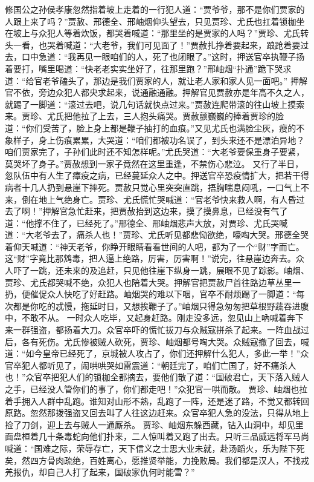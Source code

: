 \documentclass[12pt,oneside]{book}
\begin{document}
修国公之孙侯孝康忽然指着坡上走着的一行犯人道：“贾爷爷，那不是你们贾家的人跟上来了吗？”贾赦、邢德全、邢岫烟仰头望去，只见贾珍、尤氏也扛着锁枷坐在坡上与众犯人等着炊饭，都哭着喊道：“那里坐的是贾家的人吗？”贾珍、尤氏转头一看，也哭着喊道：“大老爷，我们可见面了！”贾赦扎挣着要起来，踉跄着要过去，口中急道：“我再见一眼咱们的人，死了也闭眼了。”这时，押送官卒执鞭子扬着要打，嘴里喝道：“快老老实实坐好了，往那里跑？”邢岫烟“扑通”跪下哭求道：“给官老爷磕头了，那边是我们贾家的人，就让老人家和家人见一面吧。”
押解官不依，旁边众犯人都央求起来，说通融通融。押解官见贾赦亦是年高不久之人，就踢了一脚道：“滚过去吧，说几句话就快点过来。”贾赦连爬带滚的往山坡上摸索来。贾珍、尤氏把他拉了上去，三人抱头痛哭。贾赦颤巍巍的捧着贾珍的脸道：“你们受苦了，脸上身上都是鞭子抽打的血痕。”又见尤氏也满脸尘灰，瘦的不象样子，身上伤痕累累，大哭道：“咱们都被功名误了，到头来还不是漂泊异地？咱们贾家完了，子孙们此时还不知怎样呢。”尤氏哭道：“大老爷要保重身子要紧，莫哭坏了身子。”贾赦想到一家子竟然在这里重逢，不禁伤心悲泣。
又行了半日，忽队伍中有人生了瘴疫之病，已经蔓延众人之中。押送官卒恐疫情扩大，把若干得病者十几人扔到悬崖下摔死。贾赦只觉心里突突直跳，捂胸喘息闷吼，一口气上不来，倒在地上气绝身亡。贾珍、尤氏慌忙哭喊道：“官老爷快来救人啊，有人昏过去了啊！”押解官急忙赶来，把贾赦抬到这边来，摸了摸鼻息，已经没有气了道：“他撑不住了，已经死了。”邢德全、邢岫烟悲声大放，对贾珍、尤氏哭喊道：“大老爷去了，痛杀人也！”贾珍、尤氏听见都悲恸欲绝，嚎啕大哭。邢德全哭着仰天喊道：“神天老爷，你睁开眼睛看看世间的人吧，都为了一个“财”字而亡。这“财”字竟比那鸩毒，把人逼上绝路，厉害，厉害啊！”说完，往悬崖边奔去。众人吓了一跳，还未来的及追赶，只见他往崖下纵身一跳，展眼不见了踪影。岫烟、贾珍、尤氏都哭喊不绝，众犯人也陪着大哭。押解官把贾赦尸首往路边草丛里一扔，便催促众人快吃了好赶路。岫烟哭的难以下咽，官卒不耐烦踢了一脚道：“每次都是你吃的忒慢，拖延时日，又想挨鞭子了。”岫烟只得急匆匆把草根野蔬吞进腹中，不敢不从。
一时众人吃毕，又起身赶路。刚走没多远，忽见山上吶喊着奔下来一群强盗，都扬着大刀。众官卒吓的慌忙拔刀与众贼寇拼杀了起来。一阵血战过后，各有死伤。尤氏惨被贼人砍死，贾珍、岫烟都号啕大哭。众贼寇撤了回去，喊道：“如今皇帝已经死了，京城被人攻占了，你们还押解什么犯人，多此一举！”众官卒犯人都听见了，闹哄哄哭如雷震道：“朝廷完了，咱们亡国了，好不痛杀人也！”众官卒把犯人们的锁枷全都摘去，要他们散了道：“国破君亡，天下落入贼人之手，已经没人管你们的事了，你们都走吧！”众犯官一哄而散。
贾珍、岫烟也拉着手拥入人群中乱跑。谁知对山形不熟，乱跑了一阵，还是迷了路，不觉又都转回原路。忽然那拨强盗又回去叫了人往这边赶来。众官卒犯人急的没法，只得从地上捡了刀剑，迎上去与贼人一通厮杀。
贾珍、岫烟东躲西藏，钻入山洞中，却见里面盘桓着几十条毒蛇向他们扑来，二人惊叫着又跑了出去。只听三品威远将军马尚喊道：“国难之际，荣辱存亡，天下信义之士思大业未就，赴汤蹈火，乐为陛下死矣，然四方骨肉疏绝，百姓离心，愿推贤举能，力挽败局。我们都是汉人，不找戎羌报仇，却自己人打了起来，国破家仇何时能雪？”
\end{document}
